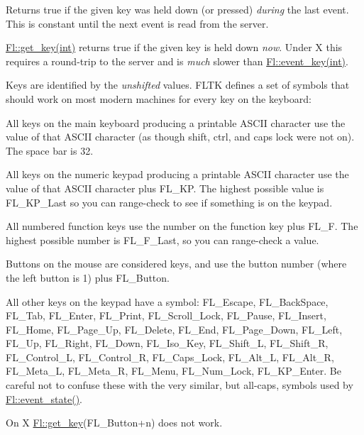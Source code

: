 Returns true if the given {\ttfamily key} was held down (or pressed) {\itshape during} the last event. This is constant until the next event is read from the server.

\hyperlink{group__fl__events_gae7cc46c942d3b62b6b55422d185b6b8d}{Fl\+::get\+\_\+key(int)} returns true if the given key is held down {\itshape now}. Under X this requires a round-\/trip to the server and is {\itshape much} slower than \hyperlink{group__fl__events_ga0647361133efe8f9bdbcf6d462116236}{Fl\+::event\+\_\+key(int)}.

Keys are identified by the {\itshape unshifted} values. F\+L\+TK defines a set of symbols that should work on most modern machines for every key on the keyboard\+:

\begin{DoxyItemize}
\item All keys on the main keyboard producing a printable A\+S\+C\+II character use the value of that A\+S\+C\+II character (as though shift, ctrl, and caps lock were not on). The space bar is 32. \item All keys on the numeric keypad producing a printable A\+S\+C\+II character use the value of that A\+S\+C\+II character plus F\+L\+\_\+\+KP. The highest possible value is F\+L\+\_\+\+K\+P\+\_\+\+Last so you can range-\/check to see if something is on the keypad. \item All numbered function keys use the number on the function key plus F\+L\+\_\+F. The highest possible number is F\+L\+\_\+\+F\+\_\+\+Last, so you can range-\/check a value. \item Buttons on the mouse are considered keys, and use the button number (where the left button is 1) plus F\+L\+\_\+\+Button. \item All other keys on the keypad have a symbol\+: F\+L\+\_\+\+Escape, F\+L\+\_\+\+Back\+Space, F\+L\+\_\+\+Tab, F\+L\+\_\+\+Enter, F\+L\+\_\+\+Print, F\+L\+\_\+\+Scroll\+\_\+\+Lock, F\+L\+\_\+\+Pause, F\+L\+\_\+\+Insert, F\+L\+\_\+\+Home, F\+L\+\_\+\+Page\+\_\+\+Up, F\+L\+\_\+\+Delete, F\+L\+\_\+\+End, F\+L\+\_\+\+Page\+\_\+\+Down, F\+L\+\_\+\+Left, F\+L\+\_\+\+Up, F\+L\+\_\+\+Right, F\+L\+\_\+\+Down, F\+L\+\_\+\+Iso\+\_\+\+Key, F\+L\+\_\+\+Shift\+\_\+L, F\+L\+\_\+\+Shift\+\_\+R, F\+L\+\_\+\+Control\+\_\+L, F\+L\+\_\+\+Control\+\_\+R, F\+L\+\_\+\+Caps\+\_\+\+Lock, F\+L\+\_\+\+Alt\+\_\+L, F\+L\+\_\+\+Alt\+\_\+R, F\+L\+\_\+\+Meta\+\_\+L, F\+L\+\_\+\+Meta\+\_\+R, F\+L\+\_\+\+Menu, F\+L\+\_\+\+Num\+\_\+\+Lock, F\+L\+\_\+\+K\+P\+\_\+\+Enter. Be careful not to confuse these with the very similar, but all-\/caps, symbols used by \hyperlink{group__fl__events_gafa17a5b4d8d9163631c88142e60447ed}{Fl\+::event\+\_\+state()}.\end{DoxyItemize}
On X \hyperlink{group__fl__events_gae7cc46c942d3b62b6b55422d185b6b8d}{Fl\+::get\+\_\+key}(F\+L\+\_\+\+Button+n) does not work.

